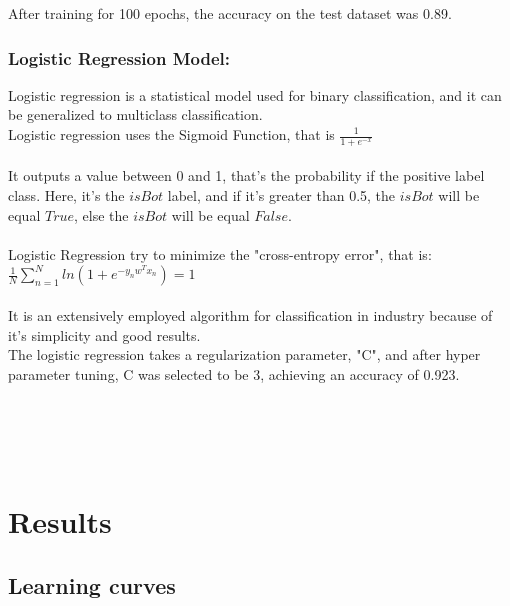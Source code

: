 \documentclass{article}
\begin{document}
    After training for 100 epochs, the accuracy on the test dataset was 0.89.
    
    \subsubsection{Logistic Regression Model:}
    
    Logistic regression is a statistical model used for binary classification, and it can be generalized to multiclass classification. \\
Logistic regression uses the Sigmoid Function, that is $\frac{1}{1+e^{-x}}$\\ \\ It outputs a value between 0 and 1, that's the probability if the positive label class. Here, it's the $isBot$ label, and if it's greater than 0.5, the $isBot$ will be equal $True$, else the $isBot$ will be equal $False$.  \\ \\
Logistic Regression try to minimize the "cross-entropy error", that is:\\ $\frac{1}{N} \sum_{n=1}^{N} ln(1 + e^ {-y_{n}w^Tx_n}) = 1$\\ \\
It is an extensively employed algorithm for classification in industry because of it's simplicity and good results. \\
The logistic regression takes a regularization parameter, "C", and after hyper parameter tuning, C was selected to be 3, achieving an accuracy of 0.923.  \\ \\ \\ \\ \\ 
        
\section{Results}
    
    \subsection{Learning curves}
    
\end{document}
